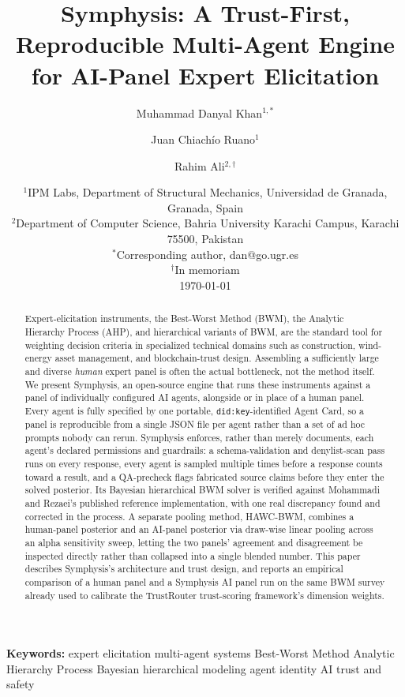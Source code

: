 \documentclass[11pt]{article}
\title{Symphysis: A Trust-First, Reproducible Multi-Agent Engine for AI-Panel Expert Elicitation}
\author{
Muhammad Danyal Khan$^{1,*}$ \and
Juan Chiach\'io Ruano$^{1}$ \and
Rahim Ali$^{2,\dagger}$
}
\date{
\small
$^{1}$IPM Labs, Department of Structural Mechanics, Universidad de Granada, Granada, Spain\\
$^{2}$Department of Computer Science, Bahria University Karachi Campus, Karachi 75500, Pakistan\\
$^{*}$Corresponding author, dan@go.ugr.es\\
$^{\dagger}$In memoriam\\[1em]
\today
}
\begin{document}
\maketitle

\begin{abstract}
Expert-elicitation instruments, the Best-Worst Method (BWM), the Analytic
Hierarchy Process (AHP), and hierarchical variants of BWM, are the standard
tool for weighting decision criteria in specialized technical domains such
as construction, wind-energy asset management, and blockchain-trust design.
Assembling a sufficiently large and diverse \emph{human} expert panel is
often the actual bottleneck, not the method itself. We present Symphysis,
an open-source engine that runs these instruments against a panel of
individually configured AI agents, alongside or in place of a human panel.
Every agent is fully specified by one portable, \texttt{did:key}-identified
Agent Card, so a panel is reproducible from a single JSON file per agent
rather than a set of ad hoc prompts nobody can rerun. Symphysis enforces,
rather than merely documents, each agent's declared permissions and
guardrails: a schema-validation and denylist-scan pass runs on every
response, every agent is sampled multiple times before a response counts
toward a result, and a QA-precheck flags fabricated source claims before
they enter the solved posterior. Its Bayesian hierarchical BWM solver is
verified against Mohammadi and Rezaei's published reference implementation,
with one real discrepancy found and corrected in the process. A separate
pooling method, HAWC-BWM, combines a human-panel posterior and an
AI-panel posterior via draw-wise linear pooling across an alpha
sensitivity sweep, letting the two panels' agreement and disagreement be
inspected directly rather than collapsed into a single blended number.
This paper describes Symphysis's architecture and trust design, and
reports an empirical comparison of a human panel and a Symphysis AI panel
run on the same BWM survey already used to calibrate the TrustRouter
trust-scoring framework's dimension weights.
\end{abstract}

\textbf{Keywords:} expert elicitation \quad multi-agent systems \quad Best-Worst Method \quad Analytic Hierarchy Process \quad Bayesian hierarchical modeling \quad agent identity \quad AI trust and safety
\end{document}
